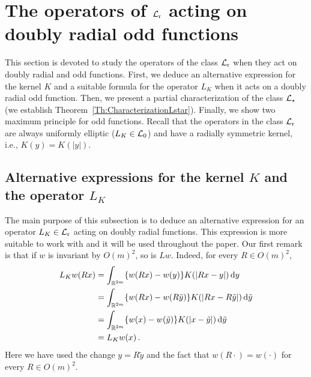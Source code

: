 \section{The operators of $\mathcal{L}_{\mathrm{r}}$ acting on doubly radial odd functions}
\label{Sec:OperatorOddF}

This section is devoted to study the operators of the class $\mathcal{L}_{\mathrm{r}}$ when they act on doubly radial and odd functions. First, we deduce an alternative expression for the kernel $K$ and a suitable formula for the operator $L_K$ when it acts on a doubly radial odd function. Then, we present a partial characterization of the class $\mathcal{L}_\star$ (we establish Theorem~\ref{Th:CharacterizationLstar}). Finally, we show two maximum principle for odd functions. Recall that the operators in the class $\mathcal{L}_{\mathrm{r}}$ are always uniformly elliptic ($L_K \in \mathcal{L}_0$) and have a radially symmetric kernel, i.e., $K(y) = K(|y|)$.  


\subsection{Alternative expressions for the kernel $K$ and the operator $L_K$}

The main purpose of this subsection is to deduce an alternative expression for an operator $L_K \in \mathcal{L}_{\mathrm{r}}$ acting on doubly radial functions. This expression is more suitable to work with and it will be used throughout the paper. Our first remark is that if $w$ is invariant by $O(m)^2$, so is $Lw$. Indeed, for every $R \in O(m)^2$,
\begin{align*}
L_K w (Rx)
& = \int_{\mathbb{R}^{2m}} \{w(Rx) - w(y)\} K(|Rx - y|)  \,\mathrm{d} y\\
& = \int_{\mathbb{R}^{2m}} \{w(Rx) - w(R\tilde{y})\} K(|Rx - R\tilde{y}|) \,\mathrm{d} \tilde{y}\\
& = \int_{\mathbb{R}^{2m}} \{w(x) - w(\tilde{y})\} K(|x-\tilde{y}|) \,\mathrm{d} \tilde{y}\\
& = L_K w (x)\,.
\end{align*}
Here we have used the change $y = R\tilde{y}$ and the fact that $w(R \cdot) = w(\cdot)$ for every $R\in O(m)^2$.


